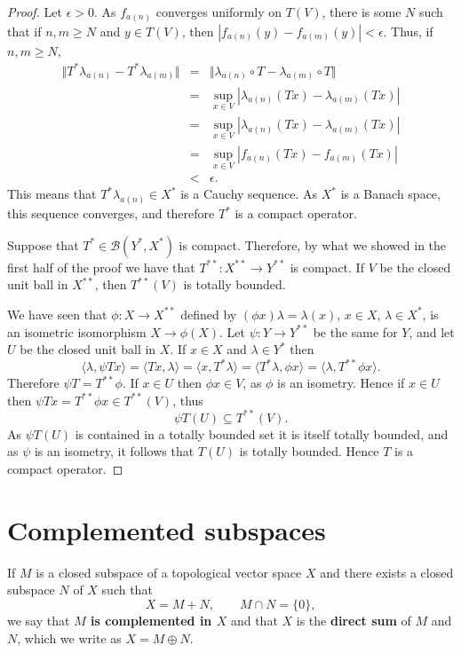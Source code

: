 \documentclass{article}
\newcommand{\inner}[2]{\langle #1, #2 \rangle}
\newcommand{\norm}[1]{\Vert #1 \Vert}
\theoremstyle{definition}
\begin{document}
\begin{proof}
Let $\epsilon>0$. As $f_{a(n)}$ converges uniformly on $T(V)$, there is some $N$ such that if $n,m \geq N$ and $y \in T(V)$, then
$|f_{a(n)}(y)-f_{a(m)}(y)|<\epsilon$. Thus, if $n,m \geq N$,
\begin{eqnarray*}
\norm{T^* \lambda_{a(n)} -T^* \lambda_{a(m)}}&=&\norm{\lambda_{a(n)} \circ T - \lambda_{a(m)} \circ T}\\
&=&\sup_{x \in V} |\lambda_{a(n)}(Tx) - \lambda_{a(m)}(Tx)|\\
&=&\sup_{x \in V} |\lambda_{a(n)}(Tx) - \lambda_{a(m)}(Tx)|\\
&=&\sup_{x \in V} |f_{a(n)}(Tx) - f_{a(m)}(Tx)|\\
&<&\epsilon.
\end{eqnarray*}
This means that $T^*\lambda_{a(n)} \in X^*$ is a Cauchy sequence. As $X^*$ is a Banach space, this sequence converges, and therefore
 $T^*$ is a compact operator. 

Suppose that $T^* \in \mathscr{B}(Y^*,X^*)$ is compact. 
Therefore, by what we showed in the first half of the proof we have that $T^{**}:X^{**} \to Y^{**}$ is compact.
If $V$ be the closed unit ball in $X^{**}$, then $T^{**}(V)$ is totally bounded.

We have seen that $\phi:X \to X^{**}$ defined by
$(\phi x)\lambda=\lambda(x)$, $x \in X$, $\lambda \in X^*$, is an isometric isomorphism $X \to \phi(X)$. Let
$\psi:Y \to Y^{**}$ be the same for $Y$, and 
let $U$ be the closed unit ball in $X$.
If $x \in X$ and $\lambda \in Y^*$ then
\[
\inner{\lambda}{\psi Tx} = \inner{Tx}{\lambda} = \inner{x}{T^* \lambda} = \inner{T^* \lambda}{\phi x}
= \inner{\lambda}{T^{**} \phi x}.
\]
Therefore $\psi T = T^{**} \phi$. If $x \in U$ then $\phi x \in V$, as $\phi$ is an isometry.
Hence if $x \in U$ then  $\psi T x = T^{**} \phi x \in T^{**}(V)$, thus
\[
\psi T(U) \subseteq T^{**}(V).
\]
As $\psi T(U)$ is contained in a totally bounded set it is itself totally bounded, and as $\psi$ is an isometry,
it follows that $T(U)$ is totally bounded. Hence $T$ is a compact operator.
\end{proof}


\section{Complemented subspaces}
If $M$ is a closed subspace of a topological vector space $X$ and there exists a closed subspace $N$ of $X$
such that 
\[
X= M+N, \qquad M \cap N =\{0\},
\]
we say that \textbf{$M$ is complemented in $X$} and that $X$ is the \textbf{direct sum} of $M$ and $N$, which we
write as $X = M \oplus N$.
\end{document}

